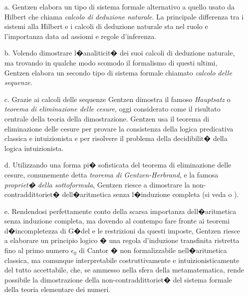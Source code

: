 \documentclass[a4paper,12pt]{aphex}
\begin{document}
\begin{itemize}
\item[a.]	Gentzen elabora un tipo di sistema formale alternativo a quello usato da Hilbert che chiama \emph{calcolo di deduzione naturale}. La principale differenza tra i sistemi alla Hilbert e i calcoli di deduzione naturale sta nel ruolo e l'importanza data ad assiomi e regole d'inferenza.

\item[b.]	Volendo dimostrare l�analiticit� dei suoi calcoli di deduzione naturale, ma trovando in qualche modo scomodo il formalismo di questi ultimi, Gentzen elabora un secondo tipo di sistema formale chiamato \emph{calcolo delle sequenze}. 



\item[c.]	Grazie ai calcoli delle sequenze Gentzen dimostra il famoso \emph{Hauptsatz} o \emph{teorema di eliminazione delle cesure}, oggi considerato come il risultato centrale della teoria della dimostrazione. Gentzen usa il teorema di eliminazione delle cesure per provare la consistenza della logica predicativa classica e intuizionista e per risolvere il problema della decidibilit� della logica intuizionista.

\item[d.]	Utilizzando una forma pi� sofisticata del teorema di eliminazione delle cesure,  comunemente detta  \emph{teorema di Gentzen-Herbrand}, e la famosa \emph{propriet� della sottoformula}, Gentzen riesce a dimostrare la non-contraddittoriet� dell�aritmetica senza l�induzione completa (si veda  \cite{casari} o  \cite{KR}). 

\item[e.]	 Rendendosi perfettamente conto della scarsa importanza dell�aritmetica senza induzione completa, ma dovendo al contempo fare fronte ai teoremi d�incompletezza di G�del e le restrizioni da questi imposte, Gentzen riesce a elaborare un principio logico � una regola d'induzione transfinita ristretta fino al primo numero $\epsilon_{0}$ di Cantor � non formalizzabile nell�aritmetica classica, ma comunque interpretabile  costruttivamente e intuizionisticamente del tutto accettabile,  che, se ammesso nella sfera della metamatematica, rende possibile la dimostrazione della non-contraddittoriet� del sistema formale della teoria elementare dei numeri.  


\end{itemize}
\end{document}
